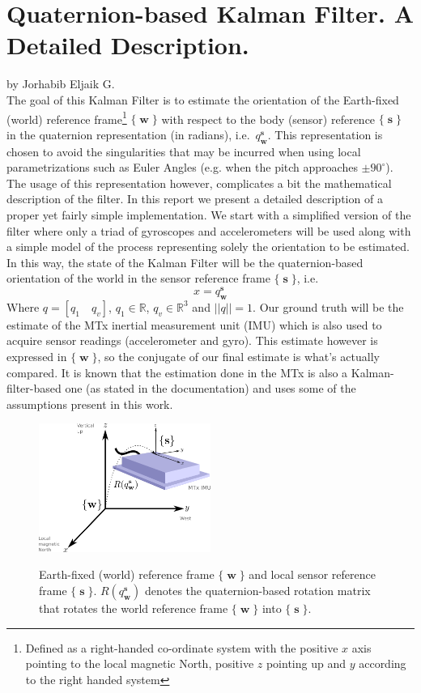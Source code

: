 \documentclass[a4paper,10pt]{article}
\DeclareMathOperator{\sensor}{\mathbf{s}}
\DeclareMathOperator{\world}{\mathbf{w}}
\begin{document}
\section*{Quaternion-based Kalman Filter. A Detailed Description.}
by Jorhabib Eljaik G. \newline \\
The goal of this Kalman Filter is to estimate the orientation of the Earth-fixed (world) reference frame\footnote{Defined as a right-handed co-ordinate system with the positive $x$ axis pointing to the local magnetic North, positive $z$ pointing up and $y$ according to the right handed system} $\{\world\}$ with respect to the body (sensor) reference $\{\sensor\}$ in the quaternion representation (in radians), i.e.~$q^{\sensor}_{\world}$. This representation is chosen to avoid the singularities that may be incurred when using local parametrizations such as Euler Angles (e.g. when the pitch approaches $\pm90^{\circ}$). The usage of this representation however, complicates a bit the mathematical description of the filter. In this report we present a detailed description of a proper yet fairly simple implementation. 
We start with a simplified version of the filter where only a triad of gyroscopes and accelerometers will be used along with a simple model of the process representing solely the orientation to be estimated. In this way, the state of the Kalman Filter will be the quaternion-based orientation of the world in the sensor reference frame $\{\sensor\}$, i.e.
\begin{equation}
  x = q^{\sensor}_{\world}
\end{equation}
Where $q = [q_1 \quad q_v]$, $q_1 \in \mathbb{R}$, $q_v \in \mathbb{R}^3$ and $||q|| = 1$. Our ground truth will be the estimate of the MTx inertial measurement unit (IMU) which is also used to acquire sensor readings (accelerometer and gyro). This estimate however is expressed in $\{\world\}$, so the conjugate of our final estimate is what's actually compared. It is known that the estimation done in the MTx is also a Kalman-filter-based one (as stated in the documentation) and uses some of the assumptions present in this work.

\begin{figure}[ht!]
 \centering
 \includegraphics[width=0.5\textwidth]{./fig/MixCoordSys.png}
 \label{fig:coordsys}
 \caption{Earth-fixed (world) reference frame $\{\world\}$ and local sensor reference frame $\{\sensor\}$. $R(q^{\sensor}_{\world})$ denotes the quaternion-based rotation matrix that rotates the world reference frame $\{\world\}$ into $\{\sensor\}$. }
\end{figure}
\end{document}
